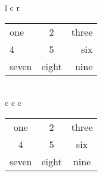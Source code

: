 \documentclass{article}
\begin{document}
l c r

\begin{tabular}{ | l | c | r | }

    \hline
    one & 2 & three \\
    4 & 5 & six \\
    seven & eight & nine \\
    \hline

\end{tabular} \\

c c c

\begin{tabular}{ | c | c | c | }

    \hline
    one & 2 & three \\
    4 & 5 & six \\
    seven & eight & nine \\
    \hline

\end{tabular} \\
\end{document}
